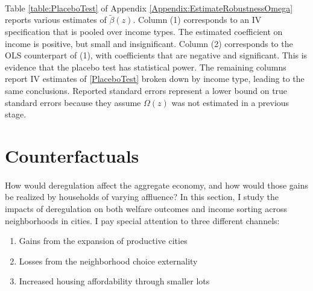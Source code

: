 \documentclass[12pt]{article}
\begin{document}
\paragraph*{}
Table \ref{table:PlaceboTest} of Appendix \ref{Appendix:EstimateRobustnessOmega} reports various estimates of $\tilde{\beta}(z)$. Column (1) corresponds to an IV specification that is pooled over income types. The estimated coefficient on income is positive, but small and insignificant. Column (2) corresponds to the OLS counterpart of (1), with coefficients that are negative and significant. This is evidence that the placebo test has statistical power. The remaining columns report IV estimates of \eqref{PlaceboTest} broken down by income type, leading to the same conclusions. Reported standard errors represent a lower bound on true standard errors because they assume $\Omega(z)$ was not estimated in a previous stage. 



\section{Counterfactuals}\label{Section:Counterfactuals}
\paragraph{}
How would deregulation affect the aggregate economy, and how would those gains be realized by households of varying affluence? In this section, I study the impacts of deregulation on both welfare outcomes and income sorting across neighborhoods in cities. I pay special attention to three different channels:

\begin{enumerate}
	\item Gains from the expansion of productive cities \citep{hseihmoretti, durantonpugaurbgrowth}
	
	\item Losses from the neighborhood choice externality \citep{hamilton1976, calabresetal}
	
	\item Increased housing affordability through smaller lots \citep{Song, kulka}
\end{enumerate}
\end{document}
